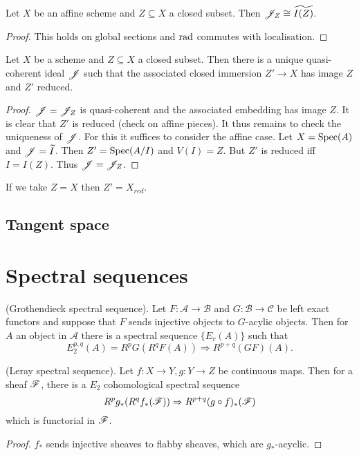\documentclass{memoir}
\begin{document}
\begin{lemma}
    Let $X$ be an affine scheme and $Z\subseteq X$ a closed subset. 
    Then $\mathscr{J}_Z\cong \widetilde{I(Z)}$.
\end{lemma}
\begin{proof}
    This holds on global sections and $\text{rad}$ commutes with localisation.
\end{proof}
\begin{thm}
    Let $X$ be a scheme and $Z\subseteq X$ a closed subset.
    Then there is a unique quasi-coherent ideal $\mathscr{J}$ such that the associated closed immersion $Z'\to X$ has image $Z$ and $Z'$ reduced.
\end{thm}
\begin{proof}
    $\mathscr{J} = \mathscr{J}_Z$ is quasi-coherent and the associated embedding has image $Z$.
    It is clear that $Z'$ is reduced (check on affine pieces).
    It thus remains to check the uniqueness of $\mathscr{J}$.
    For this it suffices to consider the affine case.
    Let $X = \operatorname{Spec}(A)$ and $\mathscr{J} = \widetilde I$. 
    Then $Z' = \operatorname{Spec}(A/I)$ and $V(I) = Z$.
    But $Z'$ is reduced iff $I = I(Z)$.
    Thus $\mathscr{J} = \mathscr{J}_{Z}$.
\end{proof}
\begin{remark}
    If we take $Z = X$ then $Z' = X_{red}$.
\end{remark}
\section{Tangent space}

\chapter{Spectral sequences}
\begin{thm}
    (Grothendieck spectral sequence).
    Let $F:\mathcal A \to \mathcal B$ and $G:\mathcal B \to \mathcal C$ be left exact functors and suppose that $F$ sends injective objects to $G$-acylic objects.
    Then for $A$ an object in $\mathcal A$ there is a spectral sequence $\{E_r(A)\}$ such that 
    \begin{equation}
        E_2^{p,q}(A) = R^pG(R^qF(A)) \Rightarrow R^{p+q}(GF)(A).
    \end{equation}
\end{thm}
\begin{corollary}
    (Leray spectral sequence).
    Let $f:X\to Y, g:Y\to Z$ be continuous maps.
    Then for a sheaf $\mathscr{F}$, there is a $E_2$ cohomological spectral sequence
    \begin{equation}
        R^pg_*(R^qf_*(\mathscr{F})) \Rightarrow R^{p+q}(g\circ f)_*(\mathscr{F})
    \end{equation}
    which is functorial in $\mathscr{F}$.
\end{corollary}
\begin{proof}
    $f_*$ sends injective sheaves to flabby sheaves, which are $g_*$-acyclic.
\end{proof}
\end{document}
